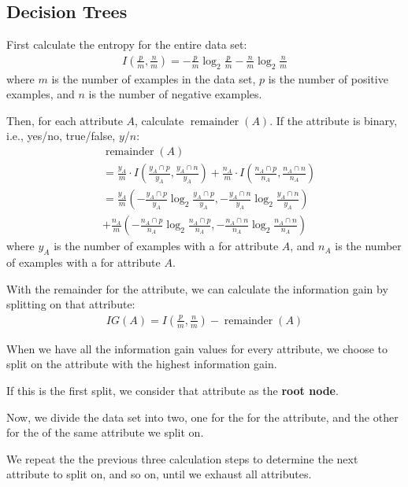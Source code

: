 \subsection{Decision Trees}
First calculate the entropy for the entire data set:
\begin{align*}
    I \left( \frac{p}{m}, \frac{n}{m} \right)
    = -\frac{p}{m} \log_2 \frac{p}{m} - \frac{n}{m} \log_2 \frac{n}{m}
\end{align*}
where $m$ is the number of examples in the data set,
$p$ is the number of positive examples, and $n$ is the number of negative examples.

Then, for each attribute $A$, calculate $\operatorname{remainder}(A)$.
If the attribute is binary, i.e., yes/no, true/false, $y$/$n$:
\begin{align*}
    & \operatorname{remainder}(A) \\
    & = \frac{y_A}{m} \cdot I \left( \frac{y_A \cap p}{y_A}, \frac{y_A \cap n}{y_A} \right)
    + \frac{n_A}{m} \cdot I \left( \frac{n_A \cap p}{n_A}, \frac{n_A \cap n}{n_A} \right) \\
    & = \frac{y_A}{m} \left( 
            -\frac{y_A \cap p}{y_A} \log_2 \frac{y_A \cap p}{y_A}, 
            -\frac{y_A \cap n}{y_A} \log_2 \frac{y_A \cap n}{y_A}
        \right) \\
    & + \frac{n_A}{m} \left( 
            -\frac{n_A \cap p}{n_A} \log_2 \frac{n_A \cap p}{n_A}, 
            -\frac{n_A \cap n}{n_A} \log_2 \frac{n_A \cap n}{n_A}
        \right)
\end{align*}
where $y_A$ is the number of examples with a  for attribute $A$,
and $n_A$ is the number of examples with a  for attribute $A$.

With the remainder for the attribute, we can calculate the information gain by splitting
on that attribute:
\begin{align*}
    IG(A) = I \left( \frac{p}{m}, \frac{n}{m} \right) - \operatorname{remainder}(A)
\end{align*}

When we have all the information gain values for every attribute, we choose to split
on the attribute with the highest information gain.

If this is the first split, we consider that attribute as the \textbf{root node}.

Now, we divide the data set into two, one for the  for the attribute,
and the other for the  of the same attribute we split on.

We repeat the the previous three calculation steps to determine the next attribute
to split on, and so on, until we exhaust all attributes.